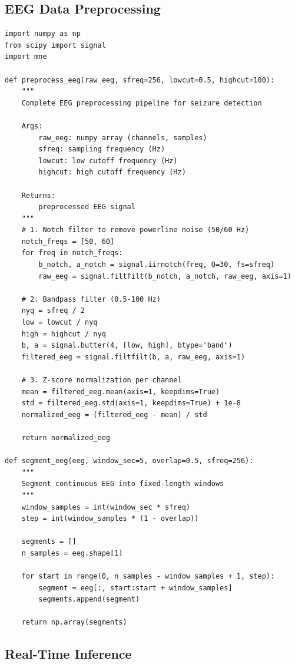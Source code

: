 \documentclass[12pt,a4paper]{article}
\begin{document}
\subsection{EEG Data Preprocessing}

\begin{lstlisting}[style=pythonstyle, caption={EEG Preprocessing Pipeline}, label={lst:preprocess}]
import numpy as np
from scipy import signal
import mne

def preprocess_eeg(raw_eeg, sfreq=256, lowcut=0.5, highcut=100):
    """
    Complete EEG preprocessing pipeline for seizure detection

    Args:
        raw_eeg: numpy array (channels, samples)
        sfreq: sampling frequency (Hz)
        lowcut: low cutoff frequency (Hz)
        highcut: high cutoff frequency (Hz)

    Returns:
        preprocessed EEG signal
    """
    # 1. Notch filter to remove powerline noise (50/60 Hz)
    notch_freqs = [50, 60]
    for freq in notch_freqs:
        b_notch, a_notch = signal.iirnotch(freq, Q=30, fs=sfreq)
        raw_eeg = signal.filtfilt(b_notch, a_notch, raw_eeg, axis=1)

    # 2. Bandpass filter (0.5-100 Hz)
    nyq = sfreq / 2
    low = lowcut / nyq
    high = highcut / nyq
    b, a = signal.butter(4, [low, high], btype='band')
    filtered_eeg = signal.filtfilt(b, a, raw_eeg, axis=1)

    # 3. Z-score normalization per channel
    mean = filtered_eeg.mean(axis=1, keepdims=True)
    std = filtered_eeg.std(axis=1, keepdims=True) + 1e-8
    normalized_eeg = (filtered_eeg - mean) / std

    return normalized_eeg

def segment_eeg(eeg, window_sec=5, overlap=0.5, sfreq=256):
    """
    Segment continuous EEG into fixed-length windows
    """
    window_samples = int(window_sec * sfreq)
    step = int(window_samples * (1 - overlap))

    segments = []
    n_samples = eeg.shape[1]

    for start in range(0, n_samples - window_samples + 1, step):
        segment = eeg[:, start:start + window_samples]
        segments.append(segment)

    return np.array(segments)
\end{lstlisting}

\subsection{Real-Time Inference}
\end{document}
